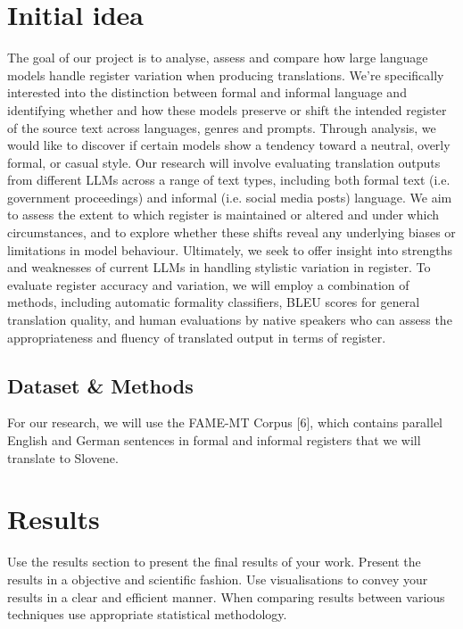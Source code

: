 \documentclass[fleqn,moreauthors,10pt]{ds_report}
\begin{document}
	
	
	
	\section*{Initial idea}
	The goal of our project is to analyse, assess and compare how large language models handle register variation when producing translations. We’re specifically interested into the distinction between formal and informal language and identifying whether and how these models preserve or shift the intended register of the source text across languages, genres and prompts. Through analysis, we would like to discover if certain models show a tendency toward a neutral, overly formal, or casual style.
	Our research will involve evaluating translation outputs from different LLMs across a range of text types, including both formal text (i.e. government proceedings) and informal (i.e. social media posts) language. We aim to assess the extent to which register is maintained or altered and under which circumstances, and to explore whether these shifts reveal any underlying biases or limitations in model behaviour. Ultimately, we seek to offer insight into strengths and weaknesses of current LLMs in handling stylistic variation in register.
	To evaluate register accuracy and variation, we will employ a combination of methods, including automatic formality classifiers, BLEU scores for general translation quality, and human evaluations by native speakers who can assess the appropriateness and fluency of translated output in terms of register.
	
	
	\subsection*{Dataset \& Methods}
	
For our research, we will use the FAME-MT Corpus [6], which contains parallel English and German sentences in formal and informal registers that we will translate to Slovene. 
	
	
		
		\section*{Results}
		
		Use the results section to present the final results of your work. Present the results in a objective and scientific fashion. Use visualisations to convey your results in a clear and efficient manner. When comparing results between various techniques use appropriate statistical methodology.
\end{document}

